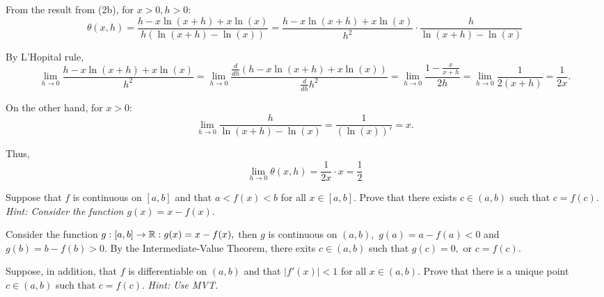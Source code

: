 \documentclass{article}
\begin{document}
\begin{soln}
    From the result from (2b), for $x > 0, h > 0:$ 
    \[
        \theta(x,h) = \frac{h - x \ln(x+h) + x \ln(x)}{h(\ln(x+h) - \ln(x))} = \frac{ h - x \ln(x+h) + x \ln(x) }{h^2} \cdot \frac{h}{\ln(x+h) - \ln(x)}
    \]

    By L'Hopital rule,
    \[
        \lim_{h \rightarrow 0} \frac{ h - x \ln(x+h) + x \ln(x) }{h^2} = \lim_{h \rightarrow 0 } \frac{\frac{d}{dh} (h - x \ln(x+h) + x \ln(x))}{\frac{d}{dh} h^2}
        = \lim_{h \rightarrow 0 } \frac{1 - \frac{x}{x+h}}{2h} = \lim_{h \rightarrow 0 } \frac{1}{2(x+h)} = \frac{1}{2x}.
    \]

    On the other hand, for $x >0:$
    \[
        \lim_{h \rightarrow 0} \frac{h}{\ln(x+h) - \ln(x)} = \frac{1}{(\ln (x))'} = x.
    \]

    Thus,
    \[
        \lim_{h \rightarrow 0} \theta(x,h) = \frac{1}{2x} \cdot x = \boxed{\frac{1}{2}}
    \]
\end{soln}

\newpage

\begin{problem*}[3a]
    Suppose that $f$ is continuous on $[a,b]$ and that $a < f(x) < b$ for all $x \in [a,b].$
    Prove that there exists $c \in (a, b)$ such that $c = f(c).$ 
    \textit{Hint: Consider the function $g(x) = x - f (x).$}
\end{problem*}

\begin{soln}
    Consider the function $g: [a,b] \rightarrow \mathbb R: g(x) = x - f(x),$
    then $g$ is continuous on $(a,b),$ $g(a) = a - f(a) < 0$ and $g(b) = b - f(b) > 0.$
    By the Intermediate-Value Theorem, there exits $c \in (a,b)$ such that $g(c) = 0,$ or $\boxed{c = f(c).}$
\end{soln}

\bigbreak

\begin{problem*}[3b]
    Suppose, in addition, that $f$ is differentiable on $(a,b)$ and that $|f'(x)| < 1$ for all $x \in (a,b).$
    Prove that there is a unique point $c \in (a, b)$ such that $c = f(c).$
    \textit{Hint: Use MVT.}
\end{problem*}
\end{document}
